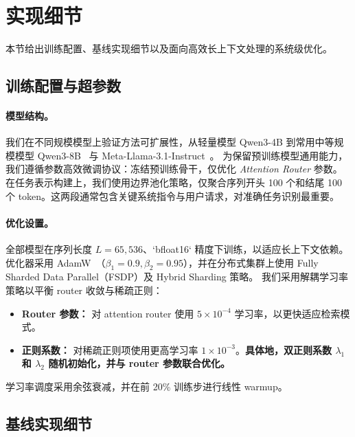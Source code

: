 

\section{实现细节}
\label{appendix:implementation_details}

本节给出训练配置、基线实现细节以及面向高效长上下文处理的系统级优化。

\subsection{训练配置与超参数}
\label{appendix:train_setting}

\paragraph{模型结构。}
我们在不同规模模型上验证方法可扩展性，从轻量模型 Qwen3-4B 到常用中等规模模型 Qwen3-8B~\citep{yang2025qwen3technicalreport} 与 Meta-Llama-3.1-Instruct~\citep{grattafiori2024llama}。
为保留预训练模型通用能力，我们遵循参数高效微调协议：冻结预训练骨干，仅优化 \textit{Attention Router} 参数。
在任务表示构建上，我们使用边界池化策略，仅聚合序列开头 100 个和结尾 100 个 token。这两段通常包含关键系统指令与用户请求，对准确任务识别最重要。

\paragraph{优化设置。}
全部模型在序列长度 $L=65,536$、`bfloat16` 精度下训练，以适应长上下文依赖。
优化器采用 AdamW~\citep{loshchilov2019decoupledweightdecayregularization}（$\beta_1=0.9, \beta_2=0.95$），并在分布式集群上使用 Fully Sharded Data Parallel（FSDP）及 Hybrid Sharding 策略。
我们采用解耦学习率策略以平衡 router 收敛与稀疏正则：
\begin{itemize}
    \item \textbf{Router 参数：} 对 attention router 使用 $5\times 10^{-4}$ 学习率，以更快适应检索模式。
    \item \textbf{正则系数：} 对稀疏正则项使用更高学习率 $1\times 10^{-3}$。\textbf{具体地，双正则系数 $\lambda_1$ 和 $\lambda_2$ 随机初始化，并与 router 参数联合优化。}
\end{itemize}
学习率调度采用余弦衰减，并在前 20\% 训练步进行线性 warmup。

\subsection{基线实现细节}
\label{appendix:baseline_train_setting}

